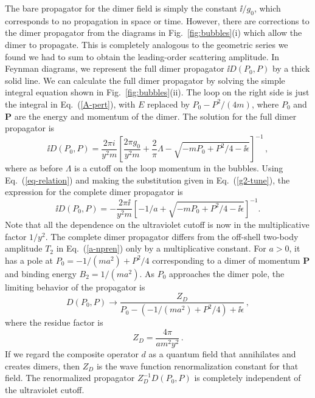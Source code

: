 The bare propagator for the dimer field is simply the constant $\ii/g_0$,
which corresponds to no propagation in space or time.  However, there are 
corrections to the dimer propagator from the diagrams in 
Fig.~\ref{fig:bubbles}(i) which allow the dimer to propagate.  This is 
completely analogous to the geometric series we found we had to sum to obtain 
the leading-order scattering amplitude.  In Feynman diagrams, we represent the 
full dimer propagator $\ii D(P_0,P)$ by a thick solid line.  We can 
calculate the full dimer propagator by solving the simple integral equation 
shown in Fig.~\ref{fig:bubbles}(ii). The loop on the right side is just the 
integral in Eq.~(\ref{A-pert}), with $E$ replaced by $P_0-P^2/(4m)$, where $P_0$ 
and ${\bm P}$ are the energy and momentum of the dimer.  The solution for the 
full dimer propagator is
\begin{equation}
 \ii D(P_0,P) = \frac{2\pi i}{y^2 m}
 \left[ \frac{2\pi g_0}{y^2 m} + \frac{2}{\pi} \Lambda -
  \sqrt{{-}mP_0 + P^2/4 - \ii \epsilon} \right]^{-1} \,,
\label{diprop}
\end{equation}
where as before $\Lambda$ is a cutoff on the loop momentum in the bubbles.
Using Eq.~(\ref{eq-relation}) and making the substitution given in 
Eq.~(\ref{g2-tune}), the expression for the complete dimer propagator is
\begin{equation}
 \ii D(P_0, P) = -\frac{2\pi \ii}{y^2 m}
 \left[ {-}1/a + \sqrt{{-}mP_0 + P^2/4 -\ii \epsilon}
 \right]^{-1} .
\label{propdiatom}
\end{equation}
Note that all the dependence on the ultraviolet cutoff is now in the
multiplicative factor $1/y^2$.  The complete dimer propagator differs from the 
off-shell two-body amplitude $T_2$ in Eq.~(\ref{a-npren}) only by a 
multiplicative constant.  For $a>0$, it has a pole at $P_0 = -1/(ma^2) + P^2/4$ 
corresponding to a dimer of momentum ${\bm P}$ and binding energy 
$B_2=1/(ma^2)$.  As $P_0$ approaches the dimer pole, the limiting behavior of 
the propagator is
\begin{equation}
 D(P_0, P) \longrightarrow
 \frac{Z_D}{P_0 - ({-}1/(ma^2)+ P^2/4) + \ii \epsilon} \,,
\label{dimer-pole}
\end{equation}
where the residue factor is
\begin{equation}
 Z_D= \frac{4\pi}{a m^2 y^2} \,.
\label{dimer-Z}
\end{equation}
If we regard the composite operator $d$ as a quantum field that annihilates and 
creates dimers, then $Z_D$ is the wave function renormalization constant for 
that field.  The renormalized propagator $Z_D^{-1} D(P_0,P)$ is completely 
independent of the ultraviolet cutoff.

